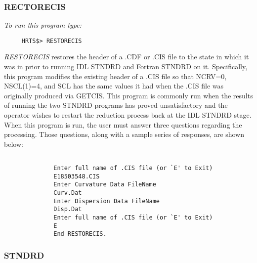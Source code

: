 \subsubsection{RECTORECIS}

{\em To run this program type:}
\begin{verbatim}
     HRTS$> RESTORECIS                      
\end{verbatim}
{\em RESTORECIS} restores the header of a .CDF or .CIS file to the state
   in which it was in prior to running IDL STNDRD and Fortran STNDRD on
   it.  Specifically, this program modifies the existing header
   of a .CIS file so that NCRV=0, NSCL(1)=4, and SCL has the same values
   it had when the .CIS file was originally produced via GETCIS.  This
   program is commonly run when the results of running the two STNDRD
   programs has proved unsatisfactory and the operator wishes to restart
   the reduction process back at the IDL STNDRD stage.  When this program
   is run, the user must answer three questions regarding the processing.
   Those questions, along with a sample series of responses, are shown
   below:
\begin{verbatim}
   
              Enter full name of .CIS file (or `E' to Exit)
              E18503548.CIS
              Enter Curvature Data FileName
              Curv.Dat
              Enter Dispersion Data FileName
              Disp.Dat
              Enter full name of .CIS file (or `E' to Exit)
              E
              End RESTORECIS.

\end{verbatim}   

\subsubsection{STNDRD}

